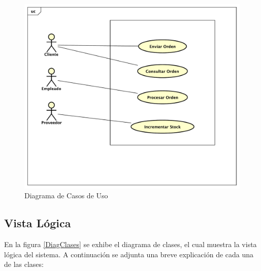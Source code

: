 \documentclass[a4paper,10pt]{article}
\begin{document}
        \newpage
        \begin{figure}[!Hhtb]                                             
            \centering                                                   
            \includegraphics[width=15cm,origin=c]{Imagenes/Casos_De_Uso.pdf}        
            \caption{Diagrama de Casos de Uso} \label{DiagCU}
        \end{figure}

    \newpage
    \subsection{Vista Lógica}
        En la figura \ref{DiagClases} se exhibe el diagrama de clases, el cual
        muestra la vista lógica del sistema. A continuación se adjunta una 
        breve explicación de cada una de las clases:
\end{document}
